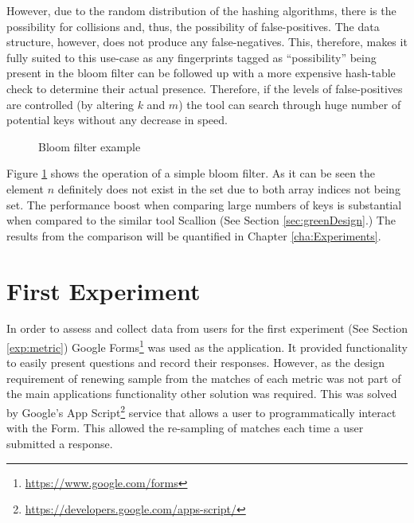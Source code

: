 However, due to the random distribution of the hashing algorithms, there is the possibility for collisions and, thus, the possibility of false-positives. The data structure, however, does not produce any false-negatives. This, therefore, makes it fully suited to this use-case as any fingerprints tagged as ``possibility'' being present in the bloom filter can be followed up with a more expensive hash-table check to determine their actual presence. Therefore, if the levels of false-positives are controlled (by altering $k$ and $m$) the tool can search through huge number of potential keys without any decrease in speed.

\begin{figure}[h!]
    \centering
    
    \caption{Bloom filter example}
    \label{fig:bloom}
\end{figure}

Figure \ref{fig:bloom} shows the operation of a simple bloom filter. As it can be seen the element $n$ definitely does not exist in the set due to both array indices not being set. The performance boost when comparing large numbers of keys is substantial when compared to the similar tool Scallion (See Section \ref{sec:greenDesign}.) The results from the comparison will be quantified in Chapter \ref{cha:Experiments}.

\section{First Experiment}
In order to assess and collect data from users for the first experiment (See Section \ref{exp:metric}) Google Forms\footnote{\url{https://www.google.com/forms}} was used as the application. It provided functionality to easily present questions and record their responses. However, as the design requirement of renewing sample from the matches of each metric was not part of the main applications functionality other solution was required. This was solved by Google's  App Script\footnote{\url{https://developers.google.com/apps-script/}} service that allows a user to programmatically interact with the Form. This allowed the re-sampling of matches each time a user submitted a response.

